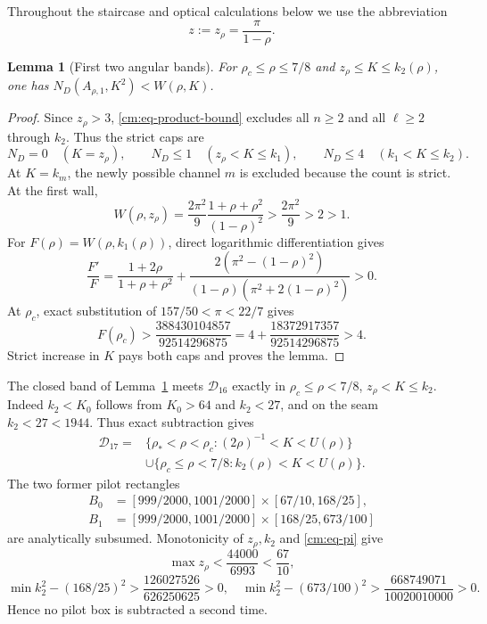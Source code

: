 \documentclass[11pt]{article}
\numberwithin{equation}{section}
\newtheorem{lemma}[theorem]{Lemma}
\theoremstyle{definition}
\theoremstyle{remark}
\begin{document}
Throughout the staircase and optical calculations below we use the
abbreviation
\[
 z:=z_\rho=\frac{\pi}{1-\rho}.
\]

\begin{lemma}[First two angular bands]
\label{cm:lem-first-bands}
For \(\rho_c\leq\rho\leq7/8\) and
\(z_\rho\leq K\leq k_2(\rho)\), one has
\(N_D(A_{\rho,1},K^2)<W(\rho,K)\).
\end{lemma}

\begin{proof}
Since \(z_\rho>3\), \eqref{cm:eq-product-bound} excludes all \(n\geq2\)
and all \(\ell\geq2\) through \(k_2\).  Thus the strict caps are
\[
 N_D=0\quad(K=z_\rho),\qquad
 N_D\leq1\quad(z_\rho<K\leq k_1),
 \qquad N_D\leq4\quad(k_1<K\leq k_2).
\]
At \(K=k_m\), the newly possible channel \(m\) is excluded because the
count is strict.  At the first wall,
\[
 W(\rho,z_\rho)=\frac{2\pi^2}{9}
 \frac{1+\rho+\rho^2}{(1-\rho)^2}>\frac{2\pi^2}{9}>2>1.
\]
For \(F(\rho)=W(\rho,k_1(\rho))\), direct logarithmic differentiation gives
\[
 \frac{F'}F=\frac{1+2\rho}{1+\rho+\rho^2}
 +\frac{2(\pi^2-(1-\rho)^2)}{(1-\rho)(\pi^2+2(1-\rho)^2)}>0.
\]
At \(\rho_c\), exact substitution of
\(157/50<\pi<22/7\) gives
\[
 F(\rho_c)>
 \frac{388430104857}{92514296875}
 =4+\frac{18372917357}{92514296875}>4.
\]
Strict increase in \(K\) pays both caps and proves the lemma.
\end{proof}

The closed band of Lemma~\ref{cm:lem-first-bands} meets
\(\mathcal D_{16}\) exactly in
\(\rho_c\leq\rho<7/8\), \(z_\rho<K\leq k_2\).  Indeed
\(k_2<K_0\) follows from \(K_0>64\) and \(k_2<27\), and on the seam
\(k_2<27<1944\).  Thus exact subtraction gives
\begin{equation}
\begin{aligned}
 \mathcal D_{17}={}&
 \{\rho_*<\rho<\rho_c:(2\rho)^{-1}<K<U(\rho)\}\\
 &\cup\{\rho_c\leq\rho<7/8:k_2(\rho)<K<U(\rho)\}.
\end{aligned}
 \label{cm:eq-D17}
\end{equation}
The two former pilot rectangles
\[
\begin{aligned}
 B_0&=[999/2000,1001/2000]\times[67/10,168/25],\\
 B_1&=[999/2000,1001/2000]\times[168/25,673/100]
\end{aligned}
\]
are analytically subsumed.  Monotonicity of \(z_\rho,k_2\) and
\eqref{cm:eq-pi} give
\[
 \max z_\rho<\frac{44000}{6993}<\frac{67}{10},
\]
\[
 \min k_2^2-(168/25)^2>\frac{126027526}{626250625}>0,
 \quad
 \min k_2^2-(673/100)^2>\frac{668749071}{10020010000}>0.
\]
Hence no pilot box is subtracted a second time.
\end{document}
